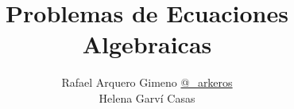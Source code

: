 \title{Problemas de Ecuaciones Algebraicas}
\author{
Rafael Arquero Gimeno 
\href{https://twitter.com/_arkeros}{@\_arkeros} \\
Helena Garví Casas
}